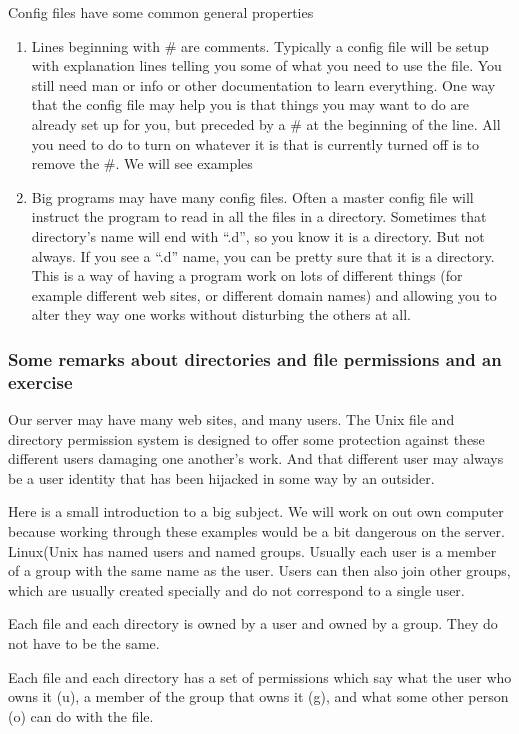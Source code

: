 \documentclass[12pt, a4paper]{article}
\begin{document}
Config files have some common general properties
\begin{enumerate}
 \item Lines beginning with \# are comments. Typically a config file will be setup with explanation lines telling you some of what you need to use the file. You still need man or info or other documentation to learn everything. One way that the config file may help you is that things you may want to do are already set up for you, but preceded by a \# at the beginning of the line. All you need to do to turn on whatever it is that is currently turned off is to remove the \#. We will see examples
 \item Big programs may have many config files. Often a master config file will instruct the program to read in all the files in a directory. Sometimes that directory’s name will end with “.d”, so you know it is a directory. But not always. If you see a “.d” name, you can be pretty sure that it is a directory. This is a way of having a program work on lots of different things (for example different web sites, or different domain names) and allowing you to alter they way one works without disturbing the others at all.    
\end{enumerate}

\subsubsection*{Some remarks about directories and file permissions and an exercise}
Our server may have many web sites, and many users. The Unix file and directory permission system is designed to offer some protection against these different users damaging one another’s work. And that different user may always be a user identity that has been hijacked in some way by an outsider.

Here is a small introduction to a big subject. We will work on out own computer because working through these examples would be a bit dangerous on the server. 
Linux(Unix has named users and named groups. Usually each user is a member of a group with the same name as the user. Users can then also join other groups, which are usually created specially and do not correspond to a single user. 

Each file and each directory is owned by a user and owned by a group. They do not have to be the same.

Each file and each directory has a set of permissions which say what the user who owns it (u), a member of the group that owns it (g), and what some other person (o) can do with the file.
\end{document}
